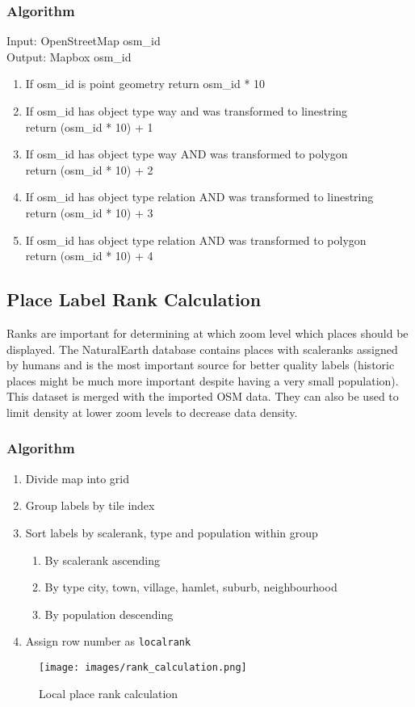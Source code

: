 \subsubsection*{Algorithm}
Input: OpenStreetMap osm\_id\\
Output: Mapbox osm\_id
\begin{enumerate}
    \item If osm\_id is point geometry return osm\_id * 10
    \item If osm\_id has object type way and was transformed to linestring\\
    return (osm\_id * 10) + 1
    \item If osm\_id has object type way AND was transformed to polygon\\
    return (osm\_id * 10) + 2
    \item If  osm\_id has object type relation AND was transformed to linestring\\
    return (osm\_id * 10) + 3
    \item If osm\_id has object type relation AND was transformed to polygon\\
    return (osm\_id * 10) + 4
\end{enumerate}

\clearpage
\subsection{Place Label Rank Calculation}

Ranks are important for determining at which zoom level which places should be displayed. The NaturalEarth database contains places with scaleranks assigned by humans and is the most important source for better quality labels (historic places might be much more important despite having a very small population). This dataset is merged with the imported OSM data.
They can also be used to limit density at lower zoom levels to decrease data density.

\subsubsection*{Algorithm}

\begin{enumerate}  
    \item Divide map into grid
    \item Group labels by tile index
    \item Sort labels by scalerank, type and population within group
    \begin{enumerate}
        \item By scalerank ascending
        \item By type city, town, village, hamlet, suburb, neighbourhood
        \item By population descending
    \end{enumerate}
    \item Assign row number as \texttt{localrank}
\end{enumerate}


\begin{figure}[H]
\centering
\texttt{[image: images/rank\_calculation.png]}
\caption{Local place rank calculation}
\end{figure}


